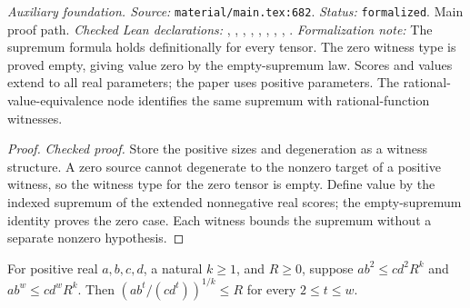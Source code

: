 \noindent\textit{Auxiliary foundation. Source:} \texttt{material/main.tex:682}.
\textit{Status:} \texttt{formalized}. Main proof path.
\textit{Checked Lean declarations:} , , , , , , , , .
\textit{Formalization note:} The supremum formula holds definitionally for every tensor. The zero witness type is proved empty, giving value zero by the empty-supremum law. Scores and values extend to all real parameters; the paper uses positive parameters. The rational-value-equivalence node identifies the same supremum with rational-function witnesses.

\begin{proof}
\leanok
{}
\textit{Checked proof.} Store the positive sizes and degeneration as a witness structure. A zero source cannot degenerate to the nonzero target of a positive witness, so the witness type for the zero tensor is empty. Define value by the indexed supremum of the extended nonnegative real scores; the empty-supremum identity proves the zero case. Each witness bounds the supremum without a separate nonzero hypothesis.
\end{proof}

\renewcommand{\thetheorem}{A55}
\begin{lemma}
\label{aux:witness-endpoint-interpolation}
\leanok
For positive real $a,b,c,d$, a natural $k\ge1$, and $R\ge0$, suppose $ab^2\le cd^2R^k$ and $ab^w\le cd^wR^k$. Then $(ab^t/(cd^t))^{1/k}\le R$ for every $2\le t\le w$.
\end{lemma}

